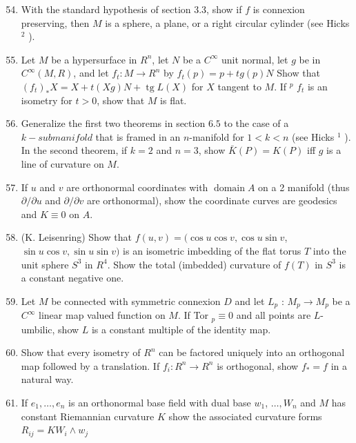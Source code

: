 \documentclass[10pt]{article}
\begin{document}
\begin{enumerate}
  \setcounter{enumi}{53}
  \item With the standard hypothesis of section 3.3, show if $f$ is connexion preserving, then $M$ is a sphere, a plane, or a right circular cylinder (see Hicks ${ }^{2}$ ).

  \item Let $M$ be a hypersurface in $R^{n}$, let $N$ be a $C^{\infty}$ unit normal, let $g$ be in $C^{\infty}(M, R)$, and let $f_{t}: M \rightarrow R^{n}$ by $f_{t}(p)=p+t g(p) N$ Show that $\left(f_{t}\right)_{*} X=X+t(X g) N+\operatorname{tg} L(X)$ for $X$ tangent to $M$. If ${ }^{p}$ $f_{t}$ is an isometry for $t>0$, show that $M$ is flat.

  \item Generalize the first two theorems in section $6.5$ to the case of a $k-s u b m a n i f o l d$ that is framed in an $n$-manifold for $1<k<n$ (see Hicks ${ }^{1}$ ). In the second theorem, if $k=2$ and $n=3$, show $\bar{K}(P)=K(P)$ iff $g$ is a line of curvature on $M$.

  \item If $u$ and $v$ are orthonormal coordinates with $\operatorname{domain} A$ on a 2 manifold (thus $\partial / \partial u$ and $\partial / \partial v$ are orthonormal), show the coordinate curves are geodesics and $K \equiv 0$ on $A$.

  \item (K. Leisenring) Show that $f(u, v)=(\cos u \cos v, \cos u \sin v$, $\sin u \cos v, \sin u \sin v)$ is an isometric imbedding of the flat torus $T$ into the unit sphere $S^{3}$ in $R^{4}$. Show the total (imbedded) curvature of $f(T)$ in $S^{3}$ is a constant negative one.

  \item Let $M$ be connected with symmetric connexion $D$ and let $L_{p}$ : $M_{p} \rightarrow M_{p}$ be a $C^{\infty}$ linear map valued function on $M .$ If Tor ${ }_{p} \equiv 0$ and all points are $L$-umbilic, show $L$ is a constant multiple of the identity map.

  \item Show that every isometry of $R^{n}$ can be factored uniquely into an orthogonal map followed by a translation. If $f_{i}: R^{n} \rightarrow R^{n}$ is orthogonal, show $f_{*}=f$ in a natural way.

  \item If $e_{1}, \ldots, e_{n}$ is an orthonormal base field with dual base $w_{1}$, $\ldots, W_{n}$ and $M$ has constant Riemannian curvature $K$ show the associated curvature forms $R_{i j}=K W_{i} \wedge w_{j}$


\end{enumerate}
\end{document}
